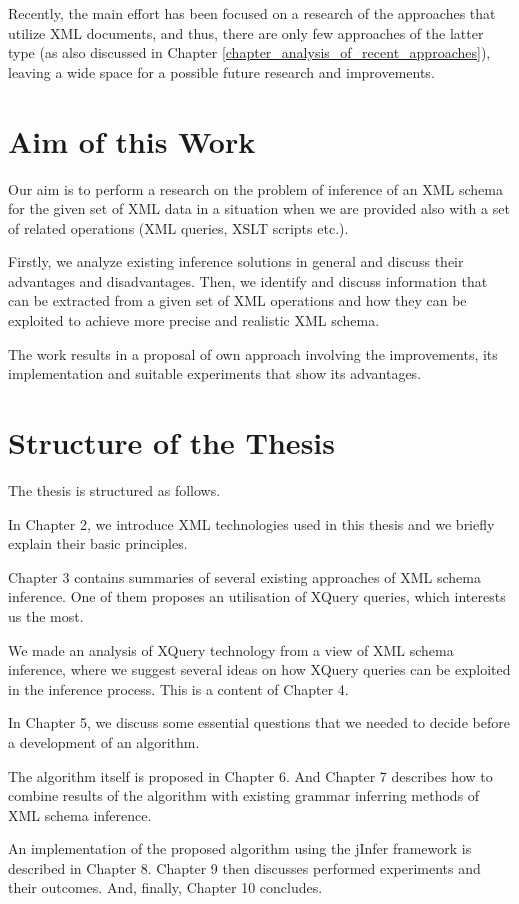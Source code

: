 Recently, the main effort has been focused on a research of the approaches that utilize XML documents, and thus, there are only few approaches of the latter type (as also discussed in Chapter \ref{chapter_analysis_of_recent_approaches}), leaving a wide space for a possible future research and improvements.

\section{Aim of this Work}
Our aim is to perform a research on the problem of inference of an XML schema for the given set of XML data in a situation when we are provided also with a set of related operations (XML queries, XSLT scripts \cite{Clark:99:XTV} etc.).

Firstly, we analyze existing inference solutions in general and discuss their advantages and disadvantages. Then, we identify and discuss information that can be extracted from a given set of XML operations and how they can be exploited to achieve more precise and realistic XML schema.

The work results in a proposal of own approach involving the improvements, its implementation and suitable experiments that show its advantages.

\section{Structure of the Thesis}
The thesis is structured as follows.

In Chapter 2, we introduce XML technologies used in this thesis and we briefly explain their basic principles.

Chapter 3 contains summaries of several existing approaches of XML schema inference. One of them proposes an utilisation of XQuery queries, which interests us the most.

We made an analysis of XQuery technology from a view of XML schema inference, where we suggest several ideas on how XQuery queries can be exploited in the inference process. This is a content of Chapter 4.

In Chapter 5, we discuss some essential questions that we needed to decide before a development of an algorithm.

The algorithm itself is proposed in Chapter 6. And Chapter 7 describes how to combine results of the algorithm with existing grammar inferring methods of XML schema inference.

An implementation of the proposed algorithm using the jInfer framework is described in Chapter 8. Chapter 9 then discusses performed experiments and their outcomes. And, finally, Chapter 10 concludes.
